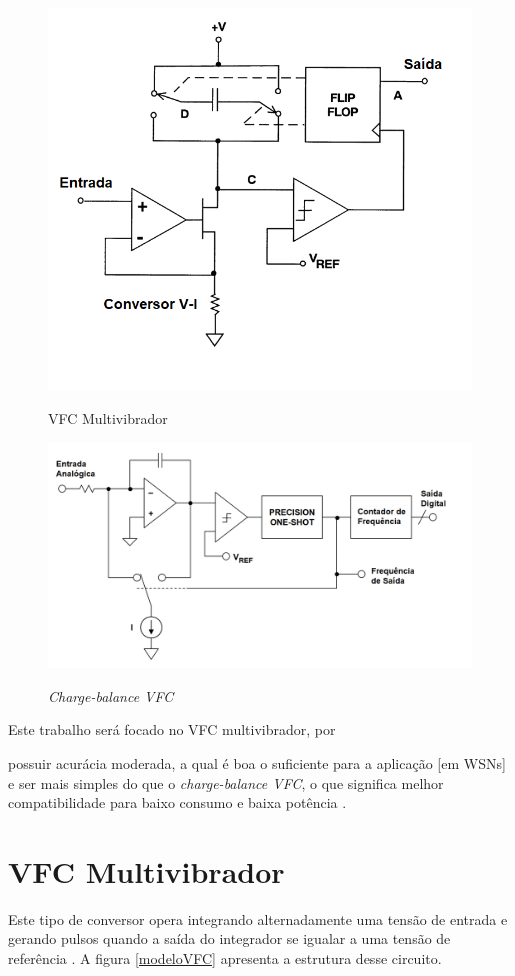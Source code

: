 \documentclass[
	12pt,				%
	oneside,			%
	a4paper,			%
	english,			%
	french,				%
	spanish,			%
	brazil				%
	]{abntex2}
\begin{document}
\begin{figure}[H]
\centering
\begin{minipage}{.5\textwidth}
  \centering
  \includegraphics[width=.8\linewidth]{multivibrador.PNG}
  \caption{VFC Multivibrador}
  \label{multivibrador}
\end{minipage}%
\begin{minipage}{.5\textwidth}
  \centering
  \includegraphics[width=.68\linewidth]{chargebalance.PNG}
  \caption{\textit{Charge-balance VFC}}
  \label{chargebalance}
\end{minipage}
\end{figure}

Este trabalho será focado no VFC multivibrador, por 
\begin{citacao}
possuir acurácia moderada, a qual é boa o suficiente para a aplicação [em WSNs] e ser mais simples do que o \textit{charge-balance VFC}, o que significa melhor compatibilidade para baixo consumo e baixa potência \cite{VFCbook}.
\end{citacao}

\section{VFC Multivibrador}
Este tipo de conversor opera integrando alternadamente uma tensão de entrada e gerando pulsos quando a saída do integrador se igualar a uma tensão de referência \cite{kirianaki}. A figura \ref{modeloVFC} apresenta a estrutura desse circuito.
\end{document}

